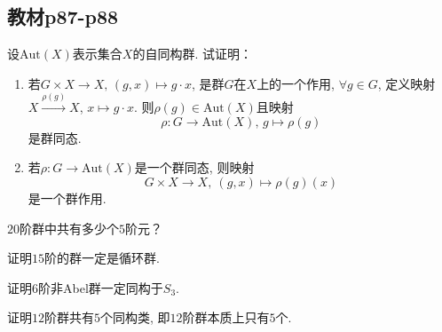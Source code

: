 \subsection{教材p87-p88}

\begin{problem}
    设$\mathrm{Aut}(X)$表示集合$X$的自同构群. 试证明：
\begin{enumerate}[(1)]
    \item 若$G \times X \to X,\, (g, x) \mapsto g \cdot x$,
是群$G$在$X$上的一个作用, $\forall g \in G$, 定义映射
$X \xrightarrow{\rho(g)} X$, $x \mapsto g \cdot x$.
则$\rho(g) \in \mathrm{Aut}(X)$且映射
\[
    \rho:G \to \mathrm{Aut}(X),\, g \mapsto \rho(g)
\]
是群同态.
    \item 若$\rho:G \to \mathrm{Aut}(X)$是一个群同态, 则映射
\[
    G \times X \to X,\: (g, x) \mapsto \rho(g)(x)
\]
是一个群作用.
\end{enumerate}
\end{problem}

\begin{solution}
    
\end{solution}

\begin{problem}
    $20$阶群中共有多少个$5$阶元？
\end{problem}

\begin{solution}
    
\end{solution}

\begin{problem}
    证明$15$阶的群一定是循环群.
\end{problem}

\begin{solution}
    
\end{solution}

\begin{problem}
    证明$6$阶非Abel群一定同构于$S_3$.
\end{problem}

\begin{solution}
    
\end{solution}

\begin{problem}
    证明$12$阶群共有$5$个同构类, 即$12$阶群本质上只有$5$个.
\end{problem}

\begin{solution}
    
\end{solution}

